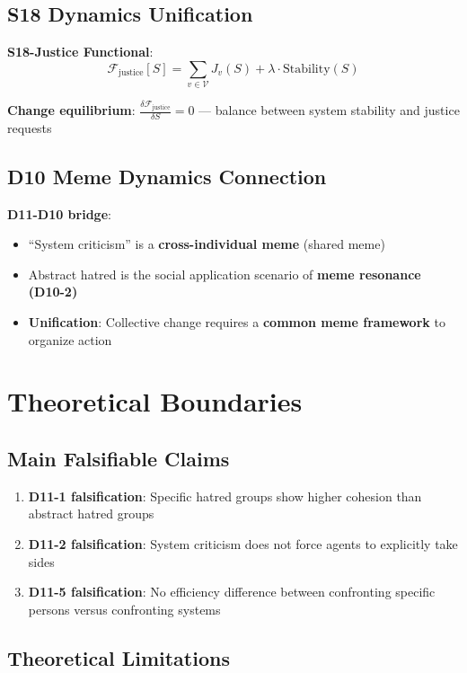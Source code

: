 \documentclass[12pt,a4paper]{article}
\newcommand{\calV}{\mathcal{V}}
\newcommand{\calF}{\mathcal{F}}
\begin{document}
\subsection{S18 Dynamics Unification}

\textbf{S18-Justice Functional}:
$$\calF_{\text{justice}}[S] = \sum_{v \in \calV} J_v(S) + \lambda \cdot \text{Stability}(S)$$

\textbf{Change equilibrium}: $\frac{\delta \calF_{\text{justice}}}{\delta S} = 0$ — balance between system stability and justice requests

\subsection{D10 Meme Dynamics Connection}

\textbf{D11-D10 bridge}:
\begin{itemize}
    \item ``System criticism'' is a \textbf{cross-individual meme} (shared meme)
    \item Abstract hatred is the social application scenario of \textbf{meme resonance (D10-2)}
    \item \textbf{Unification}: Collective change requires a \textbf{common meme framework} to organize action
\end{itemize}

\section{Theoretical Boundaries}

\subsection{Main Falsifiable Claims}

\begin{enumerate}
    \item \textbf{D11-1 falsification}: Specific hatred groups show higher cohesion than abstract hatred groups
    \item \textbf{D11-2 falsification}: System criticism does not force agents to explicitly take sides
    \item \textbf{D11-5 falsification}: No efficiency difference between confronting specific persons versus confronting systems
\end{enumerate}

\subsection{Theoretical Limitations}
\end{document}
